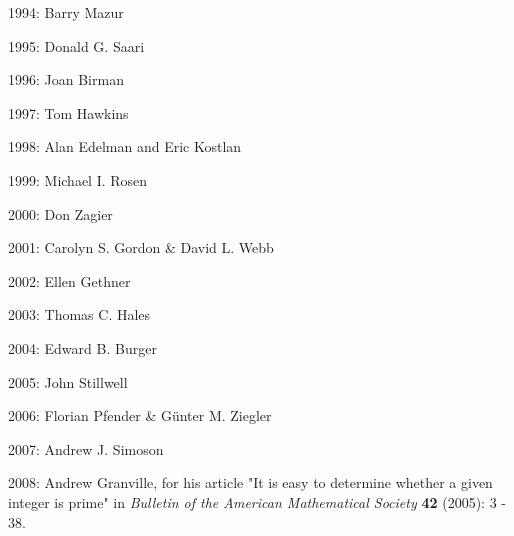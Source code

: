 \documentclass[12pt]{article}
\begin{document}
1994: Barry Mazur 

1995: Donald G. Saari 

1996: Joan Birman 

1997: Tom Hawkins 

1998: Alan Edelman and Eric Kostlan 

1999: Michael I. Rosen 

2000: Don Zagier 

2001: Carolyn S. Gordon \& David L. Webb 

2002: Ellen Gethner 

2003: Thomas C. Hales 

2004: Edward B. Burger 

2005: John Stillwell 

2006: Florian Pfender \& G\"unter M. Ziegler

2007: Andrew J. Simoson

2008: Andrew Granville, for his article "It is easy to determine whether a given integer is prime" in {\it Bulletin of the American Mathematical Society} {\bf 42} (2005): 3 - 38.
\end{document}
